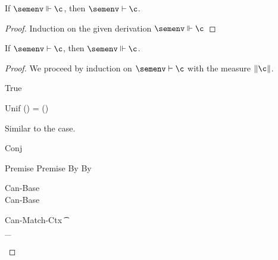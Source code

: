 \documentclass[acmsmall,screen,nonacm%
\Anonymous{,anonymous}{}%
\Final{}{,review}%
]{acmart}
\begin{document}
\begin{lemma}[Decanonicalization]
  \label{lem:decanonicalization}
  If $\semenv \Th \c$, then $\semenv \th \c$.
  \begin{proof}
    Induction on the given derivation $\semenv \Th \c$
  \end{proof}
\end{lemma}

\begin{theorem}[Canonicalization]
  \label{thm:canonicalization}
  If $\semenv \th \c$, then $\semenv \Th \c$.
  \begin{proof}
  We proceed by induction on $\semenv \th \c$ with the measure $\cmeasure \c$.
  \begin{proofcases}
    \proofcasederivation
      {True}
      { }
      {\semenv \th \ctrue}

      \begin{llproof}
\Hand   {}
      \end{llproof}

    \proofcasederivation
      {Unif}
      {\semenv(\ta) = \semenv(\tb)}
      {\semenv \th \cunif \ta \tb}

      \begin{llproof}
	Similar to the  case.
      \end{llproof}
    \proofcasederivation
      {Conj}
      {\semenv \th \ca \\ \semenv \th \cb}
      {\semenv \th \ca \cand \cb}

      \begin{llproof}
	\vdashPf{\semenv}{\ca} {Premise}
	\vdashPf{\semenv}{\cb} {Premise}
	\VdashPf{\semenv}{\ca} {By \ih}
	\VdashPf{\semenv}{\cb} {By \ih}
	\decolumnizePf
	\casesPf{\semenv \Th \ca, \semenv \Th \cb}
      \end{llproof}

      \begin{proofcases}
	\proofcasederivationdouble
	  {Can-Base}
	  {\semenv \th \ca \\ \ca \simple}
	  {\semenv \Th \ca}
	  {Can-Base}
	  {\semenv \th \cb \\ \cb \simple}
	  {\semenv \Th \cb}

        \begin{llproof}
\Hand     {}
        \end{llproof}


	\proofcasederivationdouble
	  {Can-Match-Ctx}
	  {\Cshape \C \t \sh \\ \semenv \Th \C\where{\cmatched \t \sh \cbrs}}
	  {\semenv \Th \underbrace{\C\where{\cmatch \t \cbrs}}_\ca}
	  {}
	  {}
	  {\semenv \Th \cb}


\end{proofcases}
\end{proofcases}
\end{proof}
\end{theorem}
\end{document}
